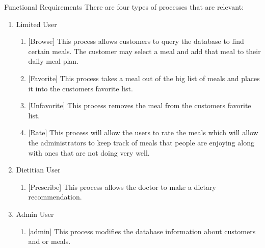 \documentclass[a4paper,10pt,toc=graduated]{article}
\begin{document}
\begin{mySubsection}{Functional Requirements}
There are four types of processes that are relevant:
\renewcommand{\labelenumi}{}
\renewcommand{\labelenumii}{}
\begin{enumerate}
\item
Limited User
\begin{enumerate}
\item {[Browse]}
This process allows customers to query the database to find certain meals. The customer may select a meal and add that meal to their daily meal plan.
\item {[Favorite]}
This process takes a meal out of the big list of meals and places it into the customers favorite list.
\item {[Unfavorite]}
This process removes the meal from the customers favorite list.
\item {[Rate]}
This process will allow the users to rate the meals which will allow the administrators to keep track of meals that people are enjoying along with ones that are not doing very well.
\end{enumerate}
\item Dietitian User
\begin{enumerate}
\item {[Prescribe]}
This process allows the doctor to make a dietary recommendation.
\end{enumerate}
\item
Admin User
\begin{enumerate}
\item {[admin]}
This process modifies the database information about customers and or meals.
\end{enumerate}
\end{enumerate}
\end{mySubsection}
\end{document}
